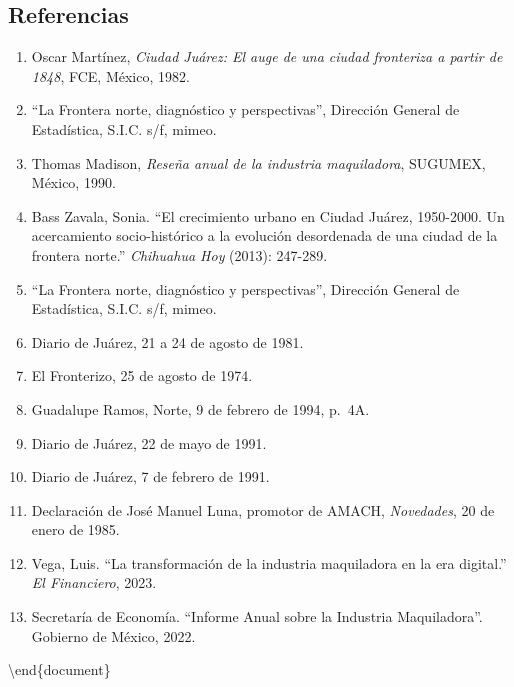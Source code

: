 \documentclass[
  10pt,
  letterpaper,
]{book}
\providecommand{\tightlist}{%
  \setlength{\itemsep}{0pt}\setlength{\parskip}{0pt}}\usepackage{longtable,booktabs,array}
\newlength{\cslhangindent}
\newenvironment{CSLReferences}[2] %
 {\begin{list}{}{%
  \setlength{\itemindent}{0pt}
  \setlength{\leftmargin}{0pt}
  \setlength{\parsep}{0pt}
  \ifodd #1
   \setlength{\leftmargin}{\cslhangindent}
   \setlength{\itemindent}{-1\cslhangindent}
  \fi
  \setlength{\itemsep}{#2\baselineskip}}}
 {\end{list}}
\begin{document}
\label{refs}
\begin{CSLReferences}{0}{1}
\subsection*{Referencias}\label{referencias-1}

\begin{enumerate}
\def\labelenumi{\arabic{enumi}.}
\tightlist
\item
  Oscar Martínez, \emph{Ciudad Juárez: El auge de una ciudad fronteriza
  a partir de 1848}, FCE, México, 1982.
\item
  ``La Frontera norte, diagnóstico y perspectivas'', Dirección General
  de Estadística, S.I.C. s/f, mimeo.
\item
  Thomas Madison, \emph{Reseña anual de la industria maquiladora},
  SUGUMEX, México, 1990.
\item
  Bass Zavala, Sonia. ``El crecimiento urbano en Ciudad Juárez,
  1950-2000. Un acercamiento socio-histórico a la evolución desordenada
  de una ciudad de la frontera norte.'' \emph{Chihuahua Hoy} (2013):
  247-289.
\item
  ``La Frontera norte, diagnóstico y perspectivas'', Dirección General
  de Estadística, S.I.C. s/f, mimeo.
\item
  Diario de Juárez, 21 a 24 de agosto de 1981.
\item
  El Fronterizo, 25 de agosto de 1974.
\item
  Guadalupe Ramos, Norte, 9 de febrero de 1994, p.~4A.
\item
  Diario de Juárez, 22 de mayo de 1991.
\item
  Diario de Juárez, 7 de febrero de 1991.
\item
  Declaración de José Manuel Luna, promotor de AMACH, \emph{Novedades},
  20 de enero de 1985.
\item
  Vega, Luis. ``La transformación de la industria maquiladora en la era
  digital.'' \emph{El Financiero}, 2023.
\item
  Secretaría de Economía. ``Informe Anual sobre la Industria
  Maquiladora''. Gobierno de México, 2022.
\end{enumerate}

\end{CSLReferences}

\textbackslash end\{document\}


\backmatter

\backmatter
\printbibliography
\end{document}
